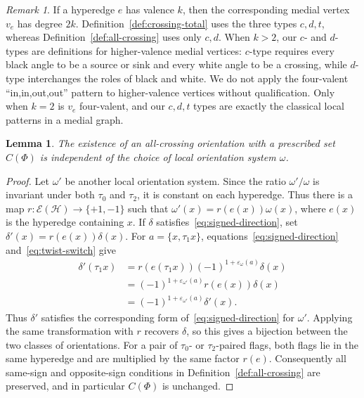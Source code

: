 \documentclass{article}
\newtheorem{lemma}[theorem]{Lemma}
\theoremstyle{definition}
\theoremstyle{remark}
\newtheorem{remark}[theorem]{Remark}
\newcommand{\Hcal}{\mathcal{H}}
\newcommand{\Ecal}{\mathcal{E}}
\begin{document}
\begin{remark}\label{rem:high-valence}
If a hyperedge $e$ has valence $k$, then the corresponding medial vertex $v_e$ has degree $2k$. Definition~\ref{def:crossing-total} uses the three types $c,d,t$, whereas Definition~\ref{def:all-crossing} uses only $c,d$. When $k>2$, our $c$- and $d$-types are definitions for higher-valence medial vertices: $c$-type requires every black angle to be a source or sink and every white angle to be a crossing, while $d$-type interchanges the roles of black and white. We do not apply the four-valent ``in,in,out,out'' pattern to higher-valence vertices without qualification. Only when $k=2$ is $v_e$ four-valent, and our $c,d,t$ types are exactly the classical local patterns in a medial graph.
\end{remark}

\begin{lemma}\label{lem:choice-independent}
The existence of an all-crossing orientation with a prescribed set $C(\Phi)$ is independent of the choice of local orientation system $\omega$.
\end{lemma}

\begin{proof}
Let $\omega'$ be another local orientation system. Since the ratio $\omega'/\omega$ is invariant under both $\tau_0$ and $\tau_2$, it is constant on each hyperedge. Thus there is a map $r:\Ecal(\Hcal)\to\{+1,-1\}$ such that $\omega'(x)=r(e(x))\omega(x)$, where $e(x)$ is the hyperedge containing $x$. If $\delta$ satisfies~\eqref{eq:signed-direction}, set $\delta'(x)=r(e(x))\delta(x)$. For $a=\{x,\tau_1x\}$, equations~\eqref{eq:signed-direction} and~\eqref{eq:twist-switch} give
\[
\begin{aligned}
 \delta'(\tau_1x)
 &=r(e(\tau_1x))(-1)^{1+\varepsilon_\omega(a)}\delta(x)\\
 &=(-1)^{1+\varepsilon_{\omega'}(a)}r(e(x))\delta(x)\\
 &=(-1)^{1+\varepsilon_{\omega'}(a)}\delta'(x).
\end{aligned}
\]
Thus $\delta'$ satisfies the corresponding form of~\eqref{eq:signed-direction} for $\omega'$. Applying the same transformation with $r$ recovers $\delta$, so this gives a bijection between the two classes of orientations. For a pair of $\tau_0$- or $\tau_2$-paired flags, both flags lie in the same hyperedge and are multiplied by the same factor $r(e)$. Consequently all same-sign and opposite-sign conditions in Definition~\ref{def:all-crossing} are preserved, and in particular $C(\Phi)$ is unchanged.
\end{proof}
\end{document}
